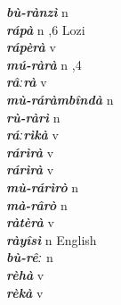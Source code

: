\begin{multicols}{2}
{{\bfseries\itshape bù-rànzì}} \relax  n   \relax  {} \relax   \relax  \\
{{\bfseries\itshape rápà}} \relax  n  ,6  \relax  Lozi \relax  \\
{{\bfseries\itshape rápèrà}} \relax  v  \relax   \relax  {} \relax   \relax  \\
{{\bfseries\itshape mú-ràrà}} \relax  n  ,4  \relax   \relax  \\
{{\bfseries\itshape râːrà}} \relax  v  \relax   \relax  {} \relax   \relax  \\
{{\bfseries\itshape mù-ráràmbîndà}} \relax  n   \relax  {} \relax   \relax  \\
{{\bfseries\itshape rù-ràrì}} \relax  n   \relax  {} \relax   \relax  \\
{{\bfseries\itshape ráːrìkà}} \relax  v  \relax   \relax  {} \relax   \relax  \\
{{\bfseries\itshape rárìrà}} \relax  v  \relax   \relax  {} \relax   \relax  \\
{{\bfseries\itshape rárìrà}} \relax  v  \relax   \relax  {} \relax   \relax  \\
{{\bfseries\itshape mù-rárìrò}} \relax  n   \relax  {} \relax   \relax  \\
{{\bfseries\itshape mà-rârò}} \relax  n   \relax  {} \relax   \relax  \\
{{\bfseries\itshape ràtèrà}} \relax  v  \relax   \relax  {} \relax   \relax  \\
{{\bfseries\itshape ràyîsì}} \relax  n   \relax  {} \relax  English \relax  \\
{{\bfseries\itshape bù-rêː}} \relax  n   \relax   \relax  \\
{{\bfseries\itshape rèhà}} \relax  v  \relax   \relax  {} \relax   \relax  \\
{{\bfseries\itshape rèkà}} \relax  v  \relax   \relax  {} \relax   \relax  \\

\end{multicols}
